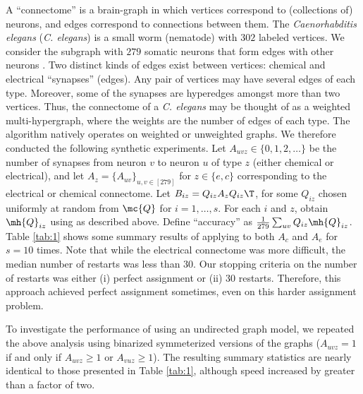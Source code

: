 \documentclass[10pt,journal,cspaper,compsoc]{IEEEtran}
\begin{document}
A ``connectome'' is a brain-graph in which vertices correspond to (collections of) neurons, and edges correspond to connections between them. The \emph{Caenorhabditis elegans} (\emph{C. elegans}) is a small worm (nematode) with $302$ labeled vertices.  We consider the subgraph with $279$ somatic neurons that form edges with other neurons \cite{WhiteBrenner86, Varshney2011}.  Two distinct kinds of edges exist between vertices: chemical and electrical ``synapses'' (edges). Any pair of vertices may have several edges of each type. Moreover, some of the synapses are hyperedges amongst more than two vertices.    Thus, the connectome of a \emph{C. elegans} may be thought of as a weighted multi-hypergraph, where the weights are the number of edges of each type.  The \rqapm algorithm natively operates on weighted or unweighted graphs.  We therefore conducted the following synthetic experiments.  Let $A_{uvz} \in \{0,1,2,\ldots\}$ be the number of synapses from neuron $v$ to neuron $u$ of type $z$ (either chemical or electrical), and let $A_z=\{A_{uv}\}_{u,v \in [279]}$ for $z \in \{e,c\}$ corresponding to the electrical or chemical connectome.  Let $B_{iz}=Q_{iz} A_z Q_{iz}\T$, for some $Q_{iz}$ chosen uniformly at random from $\mc{Q}$ for $i=1,\ldots,s$.  For each $i$ and $z$, obtain $\mh{Q}_{iz}$ using \rqapm as described above.  Define ``accuracy'' as $\frac{1}{279}\sum_{uv} Q_{iz} \mh{Q}_{iz}$.  Table \ref{tab:1} shows some summary results of applying \rqapm to both $A_c$ and $A_e$ for $s=10$ times.  
Note that while the electrical connectome was more difficult, the median number of restarts was less than $30$.  Our stopping criteria on the number of restarts was either (i) perfect assignment or (ii) 30 restarts.  Therefore, this approach achieved perfect assignment sometimes, even on this harder assignment problem.

To investigate the performance of \rqap using an undirected graph model, we repeated the above analysis using binarized symmeterized versions of the graphs ($A_{uvz}=1$ if and only if $A_{uvz}\geq 1$ or $A_{vuz} \geq 1$).  The resulting summary statistics are nearly identical to those presented in Table \ref{tab:1}, although speed increased by greater than a factor of two.
\end{document}
